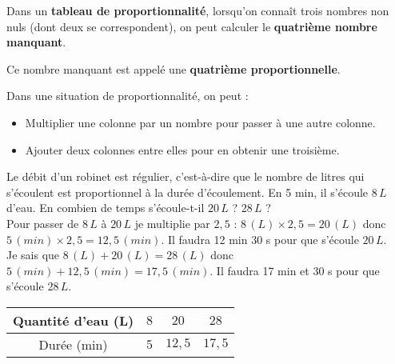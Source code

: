 \begin{pageCours}
\begin{Def}
Dans un \textbf{tableau de proportionnalité}, lorsqu'on connaît trois nombres non nuls (dont deux se correspondent), on peut calculer le \textbf{quatrième nombre manquant}.

Ce nombre manquant est appelé une \textbf{quatrième proportionnelle}.
\end{Def}

\begin{Pp}
Dans une situation de proportionnalité, on peut :
\begin{itemize}
\item Multiplier une colonne par un nombre pour passer à une autre colonne.
\item Ajouter deux colonnes entre elles pour en obtenir une troisième.
\end{itemize}
\end{Pp} 

\begin{Ex}
Le débit d'un robinet est régulier, c'est-à-dire que le nombre de litres qui s'écoulent est proportionnel à la durée d'écoulement. En 5 min, il s'écoule $8 \,L$ d'eau. En combien de temps s'écoule-t-il $20 \,L$ ? $28\,L$ ?\\

Pour passer de $8\,L$ à $20\,L$ je multiplie par $2,5$ : $8\,(L)\times2,5=20\,(L)$ donc $5\,(min)\times2,5=12,5\,(min)$. Il faudra 12 min 30 s pour que s'écoule $20\,L$.\\
Je sais que $8\,(L)+20\,(L)=28\,(L)$ donc $5\,(min)+12,5\,(min)=17,5\,(min)$. Il faudra 17 min et 30 s pour que s'écoule $28\,L$.\\
\begin{center}
    \begin{tabular}{c||c|c|c}
        Quantité d'eau (L) & $8$ & $20$ & $28$  \\
        \hline Durée (min) & $5$ & $12,5$ & $17,5$ \\
    \end{tabular}
\end{center}
\end{Ex}


\end{pageCours}
